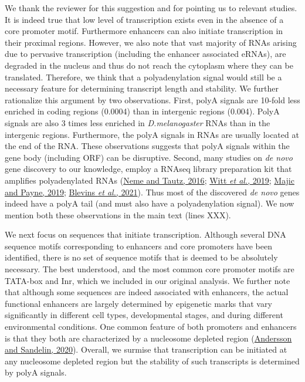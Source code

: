 \documentclass[12pt,a4paper]{article}
\begin{document}
We thank the reviewer for this suggestion and for pointing us to relevant studies. It is indeed true that low level of transcription exists even in the absence of a core promoter motif. Furthermore enhancers can also initiate transcription in their proximal regions. However, we also note that vast majority of RNAs arising due to pervasive transcription (including the enhancer associated eRNAs), are degraded in the nucleus and thus do not reach the cytoplasm where they can be translated. Therefore, we think that a polyadenylation signal would still be a necessary feature for determining transcript length and stability. We further rationalize this argument by two observations. First, polyA signals are 10-fold less enriched in coding regions (0.0004) than in intergenic regions (0.004). PolyA signals are also 3 times less enriched in \textit{D.melanogaster} RNAs than in the intergenic regions. Furthermore, the polyA signals in RNAs are usually located at the end of the RNA. These observations suggests that polyA signals within the gene body (including ORF) can be disruptive. Second, many studies on \textit{de novo} gene discovery to our knowledge, employ a RNAseq library preparation kit that amplifies polyadenylated RNAs (\href{https://doi.org/10.7554/eLife.09977}{Neme and Tautz, 2016}; \href{https://doi.org/10.7554/eLife.47138}{Witt \textit{et al.}, 2019}; \href{https://doi.org/10.1093/molbev/msz300}{Majic and Payne, 2019}; \href{https://doi.org/10.1038/s41467-021-20911-3}{Blevins \textit{et al.}, 2021}). Thus most of the discovered \textit{de novo} genes indeed have a polyA tail (and must also have a polyadenylation signal). We now mention both these observations in the main text (lines XXX).

We next focus on sequences that initiate transcription. Although several DNA sequence motifs corresponding to enhancers and core promoters have been identified, there is no set of sequence motifs that is deemed to be absolutely necessary. The best understood, and the most common core promoter motifs are TATA-box and Inr, which we included in our original analysis. We further note that although some sequences are indeed associated with enhancers, the actual functional enhancers are largely determined by epigenetic marks that vary significantly in different cell types, developmental stages, and during different environmental conditions. One common feature of both promoters and enhancers is that they both are characterized by a nucleosome depleted region (\href{https://doi.org/10.1038/s41576-019-0173-8}{Andersson and Sandelin, 2020}). Overall, we surmise that transcription can be initiated at any nucleosome depleted region but the stability of such transcripts is determined by polyA signals. 
\end{document}
